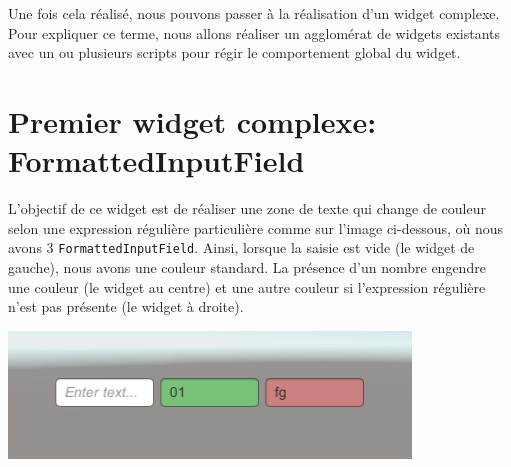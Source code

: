 \documentclass[a4paper,10pt]{article}
\begin{document}
Une fois cela réalisé, nous pouvons passer à la réalisation d'un widget complexe. Pour expliquer ce terme, nous allons réaliser un agglomérat de widgets existants avec un ou plusieurs scripts pour régir le comportement global du widget.

\section{Premier widget complexe: FormattedInputField}

L'objectif de ce widget est de réaliser une zone de texte qui change de couleur selon une expression régulière particulière comme sur l'image ci-dessous, où nous avons 3 \texttt{FormattedInputField}. Ainsi, lorsque la saisie est vide (le widget de gauche), nous avons une couleur standard. La présence d'un nombre engendre une couleur (le widget au centre) et une autre couleur si l'expression régulière n'est pas présente (le widget à droite).
\begin{center}
	\includegraphics[width=0.4\linewidth]{rc/widget_formattetinputfield_start}
\end{center}
\end{document}
